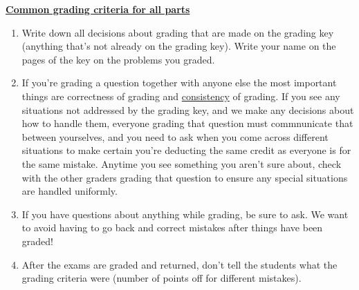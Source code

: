 \documentclass[11pt,fleqn]{article}
\begin{document}
{\begin{info}{\textbf{\underline{\Large Common grading criteria for all
                 parts}}}
\begin{enumerate}
        \item Write down all decisions about grading that are made on the
              grading key (anything that's not already on the grading key).
              Write your name on the pages of the key on the problems you
              graded.

        \item If you're grading a question together with anyone else the
              most important things are correctness of grading and
              \underline{consistency} of grading.  If you see any situations
              not addressed by the grading key, and we make any decisions
              about how to handle them, everyone grading that question must
              commnunicate that between yourselves, and you need to ask when
              you come across different situations to make certain you're
              deducting the same credit as everyone is for the same mistake.
              Anytime you see something you aren't sure about, check with the
              other graders grading that question to ensure any special
              situations are handled uniformly.

        \item If you have questions about anything while grading, be sure to
              ask.  We want to avoid having to go back and correct mistakes
              after things have been graded!

        \item After the exams are graded and returned, don't tell the students
              what the grading criteria were (number of points off for
              different mistakes).

      \end{enumerate}

      \vspace{-2.5mm}

      \pagebreak

    \end{info}

  }
\end{document}
